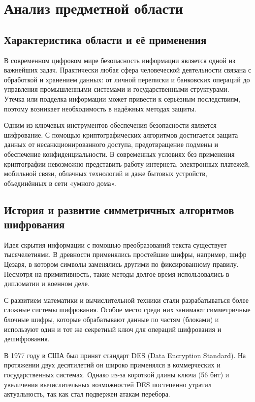 \section{Анализ предметной области}
\subsection{Характеристика области и её применения}

В современном цифровом мире безопасность информации является одной из важнейших задач. Практически любая сфера человеческой деятельности связана с обработкой и хранением данных: от личной переписки и банковских операций до управления промышленными системами и государственными структурами. Утечка или подделка информации может привести к серьёзным последствиям, поэтому возникает необходимость в надёжных методах защиты.  

Одним из ключевых инструментов обеспечения безопасности является шифрование. С помощью криптографических алгоритмов достигается защита данных от несанкционированного доступа, предотвращение подмены и обеспечение конфиденциальности. В современных условиях без применения криптографии невозможно представить работу интернета, электронных платежей, мобильной связи, облачных технологий и даже бытовых устройств, объединённых в сети «умного дома».  

\subsection{История и развитие симметричных алгоритмов шифрования}

Идея скрытия информации с помощью преобразований текста существует тысячелетиями. В древности применялись простейшие шифры, например, шифр Цезаря, в котором символы заменялись другими по фиксированному правилу. Несмотря на примитивность, такие методы долгое время использовались в дипломатии и военном деле.  

С развитием математики и вычислительной техники стали разрабатываться более сложные системы шифрования. Особое место среди них занимают симметричные блочные шифры, которые обрабатывают данные по частям (блоками) и используют один и тот же секретный ключ для операций шифрования и дешифрования.  

В 1977 году в США был принят стандарт DES (Data Encryption Standard). На протяжении двух десятилетий он широко применялся в коммерческих и государственных системах. Однако из-за короткой длины ключа (56 бит) и увеличения вычислительных возможностей DES постепенно утратил актуальность, так как стал подвержен атакам перебора.  

